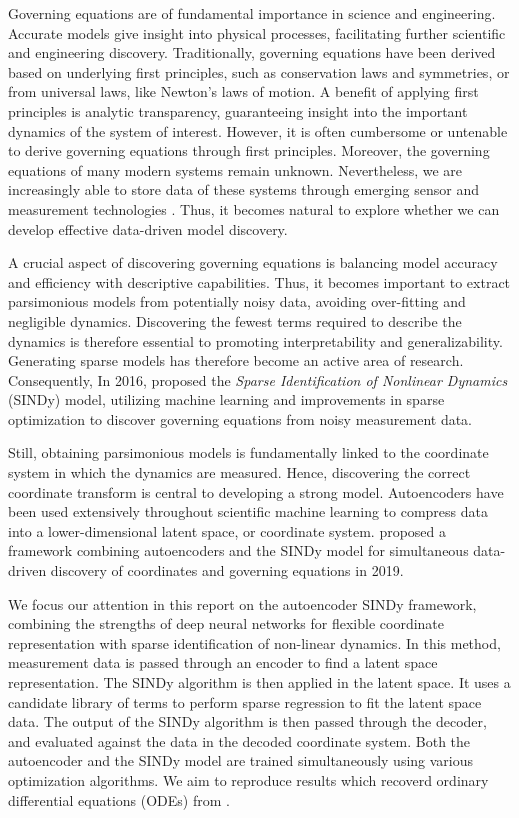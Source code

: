 Governing equations are of fundamental importance in science and engineering. 
Accurate models give insight into physical processes, facilitating further scientific and engineering discovery. 
Traditionally, governing equations have been derived based on underlying first principles, such as conservation laws and symmetries, or from universal laws, like Newton's laws of motion. 
A benefit of applying first principles is analytic transparency, guaranteeing insight into the important dynamics of the system of interest. 
However, it is often cumbersome or untenable to derive governing equations through first principles. 
Moreover, the governing equations of many modern systems remain unknown. 
Nevertheless, we are increasingly able to store data of these systems through emerging sensor and measurement technologies \cite{Champion_2019}. 
Thus, it becomes natural to explore whether we can develop effective data-driven model discovery. 

A crucial aspect of discovering governing equations is balancing model accuracy and efficiency with descriptive capabilities. 
Thus, it becomes important to extract parsimonious models from potentially noisy data, avoiding over-fitting and negligible dynamics. 
Discovering the fewest terms required to describe the dynamics is therefore essential to promoting interpretability and generalizability. 
Generating sparse models has therefore become an active area of research. 
Consequently, In 2016, \textcite{Brunton_2016} proposed the \textit{Sparse Identification of Nonlinear Dynamics} (SINDy) model, utilizing machine learning and improvements in sparse optimization to discover governing equations from noisy measurement data. 

Still, obtaining parsimonious models is fundamentally linked to the coordinate system in which the dynamics are measured. 
Hence, discovering the correct coordinate transform is central to developing a strong model. 
Autoencoders have been used extensively throughout scientific machine learning to compress data into a lower-dimensional latent space, or coordinate system. \textcite{Champion_2019} proposed a framework combining autoencoders and the SINDy model for simultaneous data-driven discovery of coordinates and governing equations in 2019.

We focus our attention in this report on the autoencoder SINDy framework, combining the strengths of deep neural networks for flexible coordinate representation with sparse identification of non-linear dynamics. 
In this method, measurement data is passed through an encoder to find a latent space representation. 
The SINDy algorithm is then applied in the latent space. 
It uses a candidate library of terms to perform sparse regression to fit the latent space data. 
The output of the SINDy algorithm is then passed through the decoder, and evaluated against the data in the decoded coordinate system. 
Both the autoencoder and the SINDy model are trained simultaneously using various optimization algorithms. 
We aim to reproduce results which recoverd ordinary differential equations (ODEs) from \textcite{Champion_2019}.%

